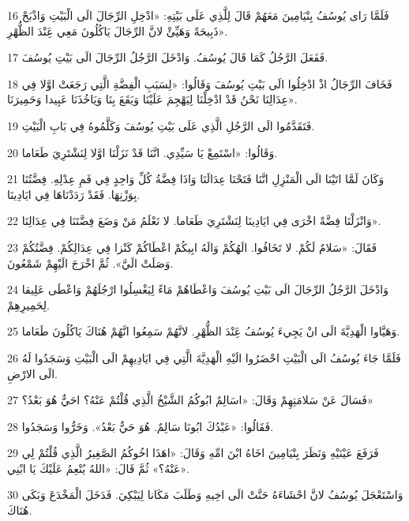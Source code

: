 \par 16 فَلَمَّا رَاى يُوسُفُ بِنْيَامِينَ مَعَهُمْ قَالَ لِلَّذِي عَلَى بَيْتِهِ: «ادْخِلِ الرِّجَالَ الَى الْبَيْتِ وَاذْبَحْ ذَبِيحَةً وَهَيِّئْ لانَّ الرِّجَالَ يَاكُلُونَ مَعِي عَِنْدَ الظُّهْرِ».
\par 17 فَفَعَلَ الرَّجُلُ كَمَا قَالَ يُوسُفُ. وَادْخَلَ الرَّجُلُ الرِّجَالَ الَى بَيْتِ يُوسُفَ.
\par 18 فَخَافَ الرِّجَالُ اذْ ادْخِلُوا الَى بَيْتِ يُوسُفَ وَقَالُوا: «لِسَبَبِ الْفِضَّةِ الَّتِي رَجَعَتْ اوَّلا فِي عِدَالِنَا نَحْنُ قَدْ ادْخِلْنَا لِيَهْجِمَ عَلَيْنَا وَيَقَعَ بِنَا وَيَاخُذَنَا عَبِيدا وَحَمِيرَنَا».
\par 19 فَتَقَدَّمُوا الَى الرَّجُلِ الَّذِي عَلَى بَيْتِ يُوسُفَ وَكَلَّمُوهُ فِي بَابِ الْبَيْتِ.
\par 20 وَقَالُوا: «اسْتَمِعْ يَا سَيِّدِي. انَّنَا قَدْ نَزَلْنَا اوَّلا لِنَشْتَرِيَ طَعَاما.
\par 21 وَكَانَ لَمَّا اتَيْنَا الَى الْمَنْزِلِ انَّنَا فَتَحْنَا عِدَالَنَا وَاذَا فِضَّةُ كُلِّ وَاحِدٍ فِي فَمِ عِدْلِهِ. فِضَّتُنَا بِوَزْنِهَا. فَقَدْ رَدَدْنَاهَا فِي ايَادِينَا.
\par 22 وَانْزَلْنَا فِضَّةً اخْرَى فِي ايَادِينَا لِنَشْتَرِيَ طَعَاما. لا نَعْلَمُ مَنْ وَضَعَ فِضَّتَنَا فِي عِدَالِنَا».
\par 23 فَقَالَ: «سَلامٌ لَكُمْ. لا تَخَافُوا. الَهُكُمْ وَالَهُ ابِيكُمْ اعْطَاكُمْ كَنْزا فِي عِدَالِكُمْ. فِضَّتُكُمْ وَصَلَتْ الَيَّ». ثُمَّ اخْرَجَ الَيْهِمْ شَمْعُونَ.
\par 24 وَادْخَلَ الرَّجُلُ الرِّجَالَ الَى بَيْتِ يُوسُفَ وَاعْطَاهُمْ مَاءً لِيَغْسِلُوا ارْجُلَهُمْ وَاعْطَى عَلِيقا لِحَمِيرِهِمْ.
\par 25 وَهَيَّاوا الْهَدِيَّةَ الَى انْ يَجِيءَ يُوسُفُ عَِنْدَ الظُّهْرِ. لانَّهُمْ سَمِعُوا انَّهُمْ هُنَاكَ يَاكُلُونَ طَعَاما.
\par 26 فَلَمَّا جَاءَ يُوسُفُ الَى الْبَيْتِ احْضَرُوا الَيْهِ الْهَدِيَّةَ الَّتِي فِي ايَادِيهِمْ الَى الْبَيْتِ وَسَجَدُوا لَهُ الَى الارْضِ.
\par 27 فَسَالَ عَنْ سَلامَتِهِمْ وَقَالَ: «اسَالِمٌ ابُوكُمُ الشَّيْخُ الَّذِي قُلْتُمْ عَنْهُ؟ احَيٌّ هُوَ بَعْدُ؟»
\par 28 فَقَالُوا: «عَبْدُكَ ابُونَا سَالِمٌ. هُوَ حَيٌّ بَعْدُ». وَخَرُّوا وَسَجَدُوا.
\par 29 فَرَفَعَ عَيْنَيْهِ وَنَظَرَ بِنْيَامِينَ اخَاهُ ابْنَ امِّهِ وَقَالَ: «اهَذَا اخُوكُمُ الصَّغِيرُ الَّذِي قُلْتُمْ لِي عَنْهُ؟» ثُمَّ قَالَ: «اللهُ يُنْعِمُ عَلَيْكَ يَا ابْنِي».
\par 30 وَاسْتَعْجَلَ يُوسُفُ لانَّ احْشَاءَهُ حَنَّتْ الَى اخِيهِ وَطَلَبَ مَكَانا لِيَبْكِيَ. فَدَخَلَ الْمَخْدَعَ وَبَكَى هُنَاكَ.
